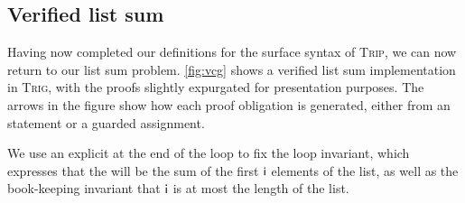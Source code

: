\documentclass[sigplan,review]{acmart}\settopmatter{printfolios=true,printccs=false,printacmref=false}
\begin{document}
\subsection{Verified list sum}
Having now completed our definitions for the surface syntax of \textsc{Trip}, we 
can now return to our list sum problem. \autoref{fig:vcg} shows a verified 
list sum implementation in \textsc{Trig}, with the proofs slightly expurgated 
for presentation purposes. The arrows in the figure show how each proof 
obligation is generated, either from an  statement or 
a guarded assignment. 

We use an explicit  at the end of the loop to fix the 
loop invariant, which expresses that the  will be the sum 
of the first $\AgdaField{i}$ elements of the list, as well as the book-keeping 
invariant that $\AgdaField{i}$ is at most the length of the list.
\end{document}
